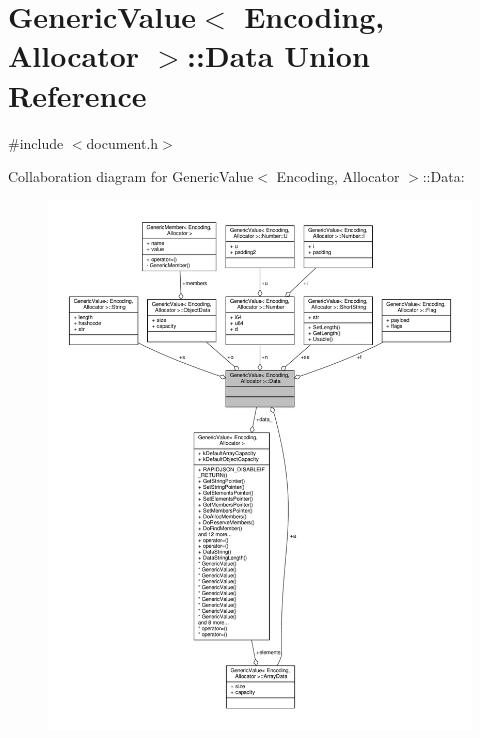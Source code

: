 \hypertarget{unionGenericValue_1_1Data}{}\section{Generic\+Value$<$ Encoding, Allocator $>$\+:\+:Data Union Reference}
\label{unionGenericValue_1_1Data}


{\ttfamily \#include $<$document.\+h$>$}



Collaboration diagram for Generic\+Value$<$ Encoding, Allocator $>$\+:\+:Data\+:
\nopagebreak
\begin{figure}[H]
\begin{center}
\leavevmode
\includegraphics[width=350pt]{unionGenericValue_1_1Data__coll__graph}
\end{center}
\end{figure}

